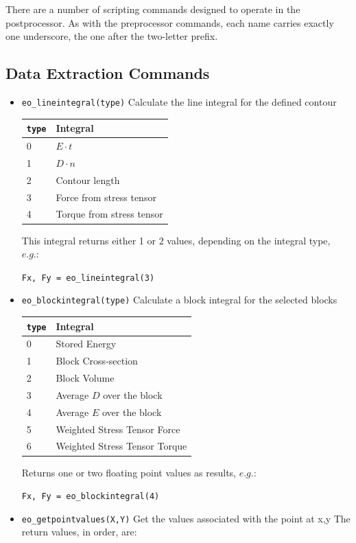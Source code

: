 There are a number of scripting commands designed to operate in
the postprocessor. As with the preprocessor commands, each name
carries exactly one underscore, the one after the two-letter prefix.

\subsection{Data Extraction Commands}
\begin{itemize}

\item \texttt{eo\_lineintegral(type)} Calculate the line integral for the defined contour

\begin{tabular}{ll}
\texttt{type} & Integral \\ \hline
 0 & $E \cdot t$ \\
 1 & $D \cdot n$ \\
 2 & Contour length \\
 3 & Force from stress tensor \\
 4 & Torque from stress tensor
\end{tabular}

This integral returns either 1 or 2 values, depending on the
integral type, $e.g.:$

\texttt{Fx, Fy = eo\_lineintegral(3)}

\item \texttt{eo\_blockintegral(type)} Calculate a block integral for the selected
blocks

\begin{tabular}{ll}
\texttt{type} & Integral \\ \hline
 0 & Stored Energy \\
 1 & Block Cross-section \\
 2 & Block Volume \\
 3 & Average $D$ over the block \\
 4 & Average $E$ over the block \\
 5 & Weighted Stress Tensor Force \\
 6 & Weighted Stress Tensor Torque
\end{tabular}

Returns one or two floating point values as results, $e.g$.:

\texttt{Fx, Fy = eo\_blockintegral(4)}

\item \texttt{eo\_getpointvalues(X,Y)} Get the values associated with the point at x,y
The return values, in order, are:


\end{itemize}
